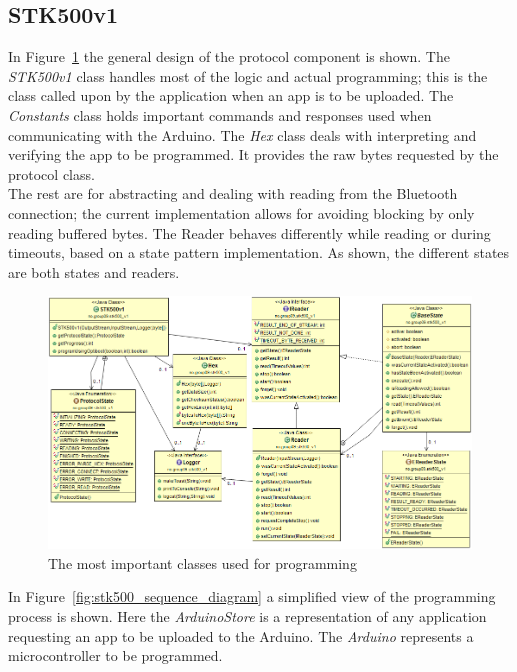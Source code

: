 	\subsection{STK500v1}
	In Figure~\ref{fig:stk500v1uml} the general design of the protocol component is shown. The \textit{STK500v1} class
    handles most of the logic and actual programming; this is the class called upon by the application when
    an app is to be uploaded. The \textit{Constants} class holds important commands and responses used when communicating
    with the Arduino. The \textit{Hex} class deals with interpreting and verifying the app to be programmed. It provides the raw bytes requested by the protocol class.\\

    The rest are for abstracting and dealing with reading from the Bluetooth connection; the current
    implementation allows for avoiding blocking by only reading buffered bytes. The Reader behaves differently while reading or during timeouts, based on a state pattern implementation. As shown, the different states are both
    states and readers.\\

	\begin{figure}[H]
	\hspace*{-1.0in}
	\includegraphics[scale=0.58]{images/UML/stk500v1.png}
	\caption[UML - Protocol]{The most important classes used for programming}
	\label{fig:stk500v1uml}
	\end{figure}

	In Figure~\ref{fig:stk500_sequence_diagram} a simplified view of the programming process is shown. Here the \textit{ArduinoStore} is a representation of any application requesting an app to be uploaded to the Arduino. The \textit{Arduino} represents a microcontroller to be programmed.\\
	
